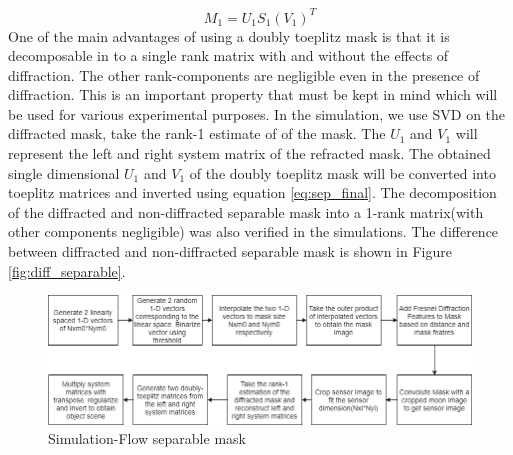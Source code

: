 \begin{equation}
\label{eq:svd_2}
M_{1} = U_{1}S_1(V_{1})^T
\end{equation}
One of the main advantages of using a doubly toeplitz mask is that it is decomposable in to a single rank matrix with and without the effects of diffraction. The other rank-components are negligible even in the presence of diffraction. This is an important property that must be kept in mind which will be used for various experimental purposes.  In the simulation, we use SVD on the diffracted mask, take the rank-1 estimate of of the mask. The $U_1$ and $V_1$ will represent the left and right system matrix of the refracted mask. The obtained single dimensional $U_1$ and $V_1$ of the doubly toeplitz mask will be converted into toeplitz matrices and inverted using equation \ref{eq:sep_final}. The decomposition of the diffracted and non-diffracted separable mask into a 1-rank matrix(with other components negligible) was also verified in the simulations.
The difference between diffracted and non-diffracted separable mask is shown in Figure \ref{fig:diff_separable}.
\begin{figure}[ht]
\includegraphics[width=\linewidth]{pics/sep_mask_sim_flow}
\caption{Simulation-Flow separable mask}
\label{fig:sep_sim}
\end{figure}
